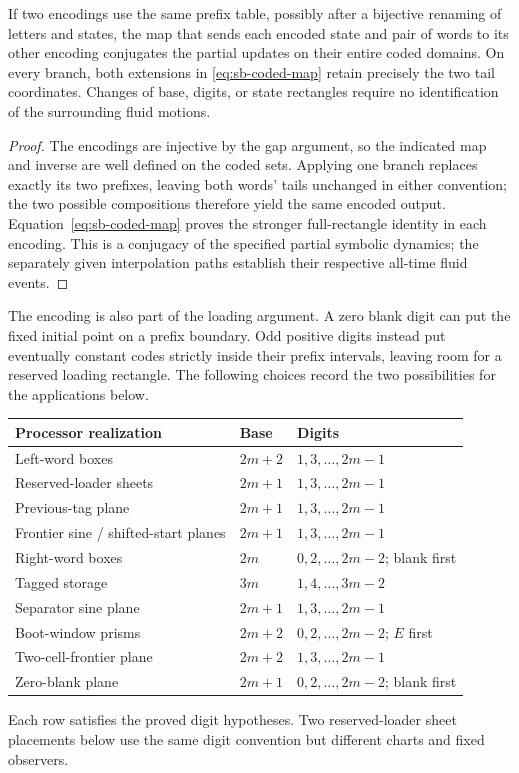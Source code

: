 \begin{lemma}\label{lem:sb-code-equivalence}
If two encodings use the same prefix table, possibly after a bijective renaming of letters and states, the map that sends each encoded state and pair of words to its other encoding conjugates the partial updates on their entire coded domains.  On every branch, both extensions in \eqref{eq:sb-coded-map} retain precisely the two tail coordinates.  Changes of base, digits, or state rectangles require no identification of the surrounding fluid motions.
\end{lemma}
\begin{proof}
The encodings are injective by the gap argument, so the indicated map and inverse are well defined on the coded sets.  Applying one branch replaces exactly its two prefixes, leaving both words' tails unchanged in either convention; the two possible compositions therefore yield the same encoded output.  Equation~\eqref{eq:sb-coded-map} proves the stronger full-rectangle identity in each encoding.  This is a conjugacy of the specified partial symbolic dynamics; the separately given interpolation paths establish their respective all-time fluid events.
\end{proof}

The encoding is also part of the loading argument. A zero blank digit
can put the fixed initial point on a prefix boundary. Odd positive digits
instead put eventually constant codes strictly inside their prefix
intervals, leaving room for a reserved loading rectangle. The following
choices record the two possibilities for the applications below.
\begin{center}\small
\begin{tabular}{lll}
Processor realization&Base&Digits\\\hline
Left-word boxes&$2m+2$&$1,3,\ldots,2m-1$\\
Reserved-loader sheets&$2m+1$&$1,3,\ldots,2m-1$\\
Previous-tag plane&$2m+1$&$1,3,\ldots,2m-1$\\
Frontier sine / shifted-start planes&$2m+1$&$1,3,\ldots,2m-1$\\
Right-word boxes&$2m$&$0,2,\ldots,2m-2$; blank first\\
Tagged storage&$3m$&$1,4,\ldots,3m-2$\\
Separator sine plane&$2m+1$&$1,3,\ldots,2m-1$\\
Boot-window prisms&$2m+2$&$0,2,\ldots,2m-2$; $E$ first\\
Two-cell-frontier plane&$2m+2$&$1,3,\ldots,2m-1$\\
Zero-blank plane&$2m+1$&$0,2,\ldots,2m-2$; blank first
\end{tabular}
\end{center}
Each row satisfies the proved digit hypotheses.  Two reserved-loader sheet placements below use the same digit convention but different charts and fixed observers.

